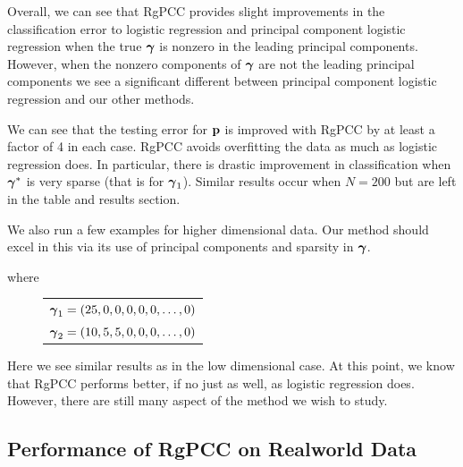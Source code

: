 \documentclass[main.tex]{subfiles}
\begin{document}
Overall, we can see that RgPCC provides slight improvements in the classification error to logistic regression and principal component logistic regression when the true $\boldsymbol \gamma$ is nonzero in the leading principal components. However, when the nonzero components of $\boldsymbol \gamma$ are not the leading principal components we see a significant different between principal component logistic regression and our other methods.

We can see that the testing error for $\mathbf{p}$ is improved with RgPCC by at least a factor of 4 in each case. RgPCC avoids overfitting the data as much as logistic regression does. In particular, there is drastic improvement in classification when $\boldsymbol \gamma^*$ is very sparse (that is for $\boldsymbol \gamma_1$). Similar results occur when $N = 200$ but are left in the table and results section.

We also run a few examples for higher dimensional data. Our method should excel in this via its use of principal components and sparsity in $\boldsymbol \gamma$.

where

\begin{figure}[H]
	\begin{tabular}{l}
		$\boldsymbol \gamma_1 = (25, 0, 0, 0, 0, 0, \ldots , 0)$ \\
		$\boldsymbol \gamma_2 = (10, 5, 5, 0, 0, 0, \ldots , 0)$
	\end{tabular}
\end{figure}

Here we see similar results as in the low dimensional case. At this point, we know that RgPCC performs better, if no just as well, as logistic regression does. However, there are still many aspect of the method we wish to study.



%
%
%
%
%
%
%
%
%
%
%
%
%
%
%

\subsection{Performance of RgPCC on Realworld Data}
\end{document}

